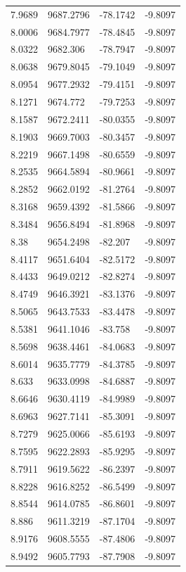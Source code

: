 \begin{table}[H]
\begin{tabular}{llll}
7.9689 & 9687.2796 & -78.1742 & -9.8097 \\
8.0006 & 9684.7977 & -78.4845 & -9.8097 \\
8.0322 & 9682.306 & -78.7947 & -9.8097 \\
8.0638 & 9679.8045 & -79.1049 & -9.8097 \\
8.0954 & 9677.2932 & -79.4151 & -9.8097 \\
8.1271 & 9674.772 & -79.7253 & -9.8097 \\
8.1587 & 9672.2411 & -80.0355 & -9.8097 \\
8.1903 & 9669.7003 & -80.3457 & -9.8097 \\
8.2219 & 9667.1498 & -80.6559 & -9.8097 \\
8.2535 & 9664.5894 & -80.9661 & -9.8097 \\
8.2852 & 9662.0192 & -81.2764 & -9.8097 \\
8.3168 & 9659.4392 & -81.5866 & -9.8097 \\
8.3484 & 9656.8494 & -81.8968 & -9.8097 \\
8.38 & 9654.2498 & -82.207 & -9.8097 \\
8.4117 & 9651.6404 & -82.5172 & -9.8097 \\
8.4433 & 9649.0212 & -82.8274 & -9.8097 \\
8.4749 & 9646.3921 & -83.1376 & -9.8097 \\
8.5065 & 9643.7533 & -83.4478 & -9.8097 \\
8.5381 & 9641.1046 & -83.758 & -9.8097 \\
8.5698 & 9638.4461 & -84.0683 & -9.8097 \\
8.6014 & 9635.7779 & -84.3785 & -9.8097 \\
8.633 & 9633.0998 & -84.6887 & -9.8097 \\
8.6646 & 9630.4119 & -84.9989 & -9.8097 \\
8.6963 & 9627.7141 & -85.3091 & -9.8097 \\
8.7279 & 9625.0066 & -85.6193 & -9.8097 \\
8.7595 & 9622.2893 & -85.9295 & -9.8097 \\
8.7911 & 9619.5622 & -86.2397 & -9.8097 \\
8.8228 & 9616.8252 & -86.5499 & -9.8097 \\
8.8544 & 9614.0785 & -86.8601 & -9.8097 \\
8.886 & 9611.3219 & -87.1704 & -9.8097 \\
8.9176 & 9608.5555 & -87.4806 & -9.8097 \\
8.9492 & 9605.7793 & -87.7908 & -9.8097 \\

\end{tabular}
\end{table}

